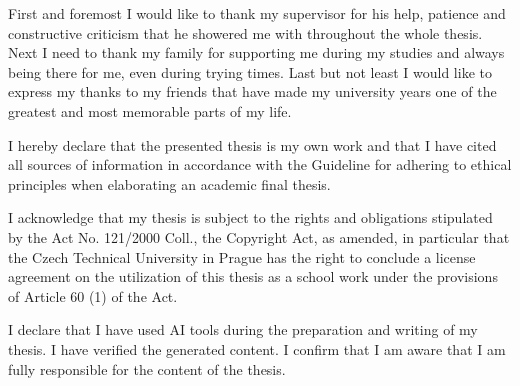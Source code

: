 \documentclass[english,master,oneside]{ctufit-thesis}
\begin{document}
\frontmatter\frontmatterinit %

\thispagestyle{empty}\maketitle\thispagestyle{empty}\cleardoublepage %



\imprintpage %
\stopTOCentries

\begin{acknowledgmentpage}
First and foremost I would like to thank my supervisor for his help, patience and constructive criticism that he showered me with throughout the whole thesis. Next I need to thank my family for supporting me during my studies and always being there for me, even during trying times. Last but not least I would like to express my thanks to my friends that have made my university years one of the greatest and most memorable parts of my life.
\end{acknowledgmentpage}


\begin{declarationpage}
I hereby declare that the presented thesis is my own work and that I have cited all sources of information in accordance with the Guideline for adhering to ethical principles when elaborating an academic final thesis.

I acknowledge that my thesis is subject to the rights and obligations stipulated by the Act No. 121/2000 Coll., the Copyright Act, as amended, in particular that the Czech Technical University in Prague has the right to conclude a license agreement on the utilization of this thesis as a school work under the provisions of Article 60 (1) of the Act.

I declare that I have used AI tools during the preparation and writing of my thesis. I have verified
the generated content. I confirm that I am aware that I am fully responsible for the content of the
thesis.
\end{declarationpage}
\end{document}
